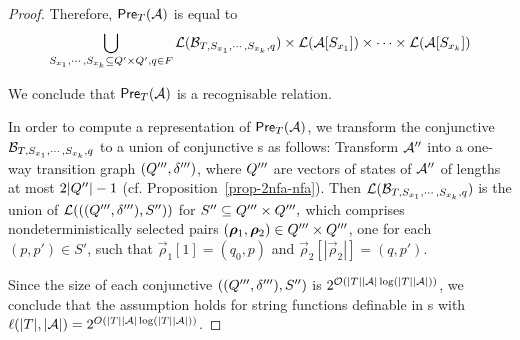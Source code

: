 \begin{proof}
\medskip


Therefore, $\textsf{Pre}_{T}(\mathcal{A})$ is equal to 
\[
\bigcup_{S_{x_1}, \cdots, S_{x_k} \subseteq Q' \times Q', q\in F} \mathcal{L}(\mathcal{B}_{T, S_{x_1}, \cdots, S_{x_k},q}) \times \mathcal{L}(\mathcal{A}[S_{x_1}]) \times \cdots  \times \mathcal{L}(\mathcal{A}[S_{x_k}])\]

We conclude that $\textsf{Pre}_{T}(\mathcal{A})$ is a recognisable relation. 

In order to compute a representation of $\textsf{Pre}_{T}(\mathcal{A})$, we transform the conjunctive \FFA{} $\mathcal{B}_{T, S_{x_1}, \cdots, S_{x_k},q}$ to a union of conjunctive \FA{}s as follows: Transform $\mathcal{A}''$ into a one-way transition graph $(Q''',\delta''')$, where $Q'''$ are vectors of states of $\mathcal{A}''$ of lengths at most $2|Q''|-1$ (cf. Proposition~\ref{prop-2nfa-nfa}). Then $\mathcal{L}(\mathcal{B}_{T, S_{x_1}, \cdots, S_{x_k},q})$ is the union of $\mathcal{L}(((Q''',\delta'''), S''))$ for $S'' \subseteq Q''' \times Q''',$ which comprises nondeterministically selected pairs $(\vec{\rho}_1, \vec{\rho}_2) \in \controls''' \times \controls'''$, one for each $(p, p') \in S'$, such that $\vec{\rho}_1[1] =(q_0, p)$ and  $\vec{\rho}_2[|\vec{\rho}_2|] = (q, p')$.

Since the size of each conjunctive \FA{} $((Q''',\delta'''), S'')$ is $ 2^{\mathcal{O}(|T||\mathcal{A}|\log (|T||\mathcal{A}|))}$, we conclude that 
the \prerec{} assumption holds for string functions definable in \PPT{}s with $\ell(|T|, |\mathcal{A}|) = 2^{O(|T||\mathcal{A}|\log (|T||\mathcal{A}|))}$.
\end{proof}

